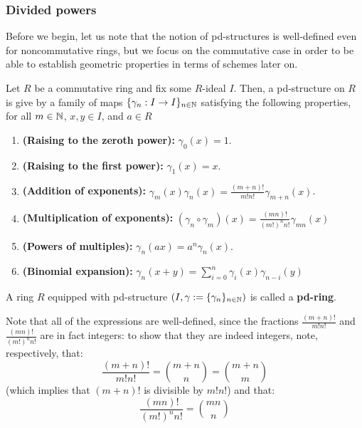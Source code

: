             \subsubsection{Divided powers}
                \begin{remark}
                    Before we begin, let us note that the notion of pd-structures is well-defined even for noncommutative rings, but we focus on the commutative case in order to be able to establish geometric properties in terms of schemes later on. 
                \end{remark}
                \begin{definition} \label{def: pd_structures}
                    Let $R$ be a commutative ring and fix some $R$-ideal $I$. Then, a pd-structure on $R$ is give by a family of maps $\{\gamma_n: I \to I\}_{n \in \mathbb{N}}$ satisfying the following properties, for all $m \in \mathbb{N}$, $x, y \in I$, and $a \in R$
                        \begin{enumerate}
                            \item \textbf{(Raising to the zeroth power):} $\gamma_0(x) = 1$.
                            \item \textbf{(Raising to the first power):} $\gamma_1(x) = x$.
                            \item \textbf{(Addition of exponents):} $\gamma_m(x)\gamma_n(x) = \frac{(m + n)!}{m!n!} \gamma_{m + n}(x)$.
                            \item \textbf{(Multiplication of exponents):} $(\gamma_n \circ \gamma_m)(x) = \frac{(mn)!}{(m!)^n n!} \gamma_{mn}(x)$
                            \item \textbf{(Powers of multiples):} $\gamma_n(ax) = a^n\gamma_n(x)$.
                            \item \textbf{(Binomial expansion):} $\gamma_n(x + y) = \sum_{i=0}^n \gamma_i(x)\gamma_{n - i}(y)$
                        \end{enumerate}
                    A ring $R$ equipped with pd-structure $\left(I, \gamma := \{\gamma_n\}_{n \in \mathbb{N}}\right)$ is called a \textbf{pd-ring}. 
                \end{definition}
                \begin{remark}
                    Note that all of the expressions are well-defined, since the fractions $\frac{(m + n)!}{m!n!}$ and $\frac{(mn)!}{(m!)^n n!}$ are in fact integers: to show that they are indeed integers, note, respectively, that:
                        $$\frac{(m + n)!}{m!n!} = \binom{m + n}{n} = \binom{m + n}{m}$$
                    (which implies that $(m + n)!$ is divisible by $m!n!$) and that:
                        $$\frac{(mn)!}{(m!)^n n!} = \binom{mn}{n}$$
                \end{remark}
                
